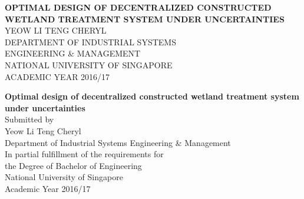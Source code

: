 \documentclass[preprint,12pt,authoryear]{elsarticle}
\begin{document}
\setlength{\abovedisplayskip}{3pt}
\setlength{\belowdisplayskip}{3pt}
\begin{titlepage}
    \begin{center}
        \vspace*{1cm}
        
        \Huge
	 \uppercase{\textbf{Optimal design of decentralized constructed wetland treatment system under uncertainties}}\\        
	 \noindent\makebox[\linewidth]{\rule{0.7\paperwidth}{0.4pt}}
        \vspace{0.5cm}
        \Large
        \uppercase{Yeow Li Teng Cheryl}\\        
        \vfill        
        \Large
        \uppercase{Department of Industrial Systems \\Engineering \& Management \\
        National University of Singapore\\
	  Academic Year 2016/17}
        
    \end{center}
\end{titlepage}


\begin{titlepage}
    \begin{center}
        \vspace*{1cm}
        
        \Huge
	 \textbf{Optimal design of decentralized constructed wetland treatment system under uncertainties}\\        
	 \noindent\makebox[\linewidth]{\rule{0.7\paperwidth}{0.4pt}}
        \vspace{0.5cm}
        \Large
	  Submitted by\\
        Yeow Li Teng Cheryl\\        
        \vspace{1.5cm}
	  Department of Industrial Systems Engineering \& Management\\
        \vfill        
        \large
        In partial fulfillment of the requirements for \\
	  the Degree of Bachelor of Engineering\\
        National University of Singapore\\
	  Academic Year 2016/17
        
    \end{center}
\end{titlepage}
\end{document}
